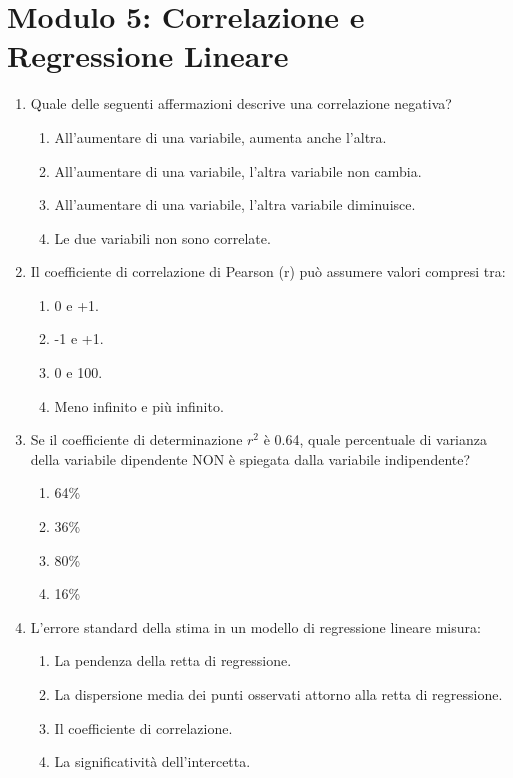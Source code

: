 \documentclass[12pt, a4paper]{article}
\begin{document}
\section*{Modulo 5: Correlazione e Regressione Lineare}
\begin{enumerate}[resume]
    \item Quale delle seguenti affermazioni descrive una correlazione negativa?
    \begin{enumerate}
        \item All'aumentare di una variabile, aumenta anche l'altra.
        \item All'aumentare di una variabile, l'altra variabile non cambia.
        \item All'aumentare di una variabile, l'altra variabile diminuisce.
        \item Le due variabili non sono correlate.
    \end{enumerate}
    \vspace{0.3cm}

    \item Il coefficiente di correlazione di Pearson (r) può assumere valori compresi tra:
    \begin{enumerate}
        \item 0 e +1.
        \item -1 e +1.
        \item 0 e 100.
        \item Meno infinito e più infinito.
    \end{enumerate}
    \vspace{0.3cm}

    \item Se il coefficiente di determinazione $r^2$ è 0.64, quale percentuale di varianza della variabile dipendente NON è spiegata dalla variabile indipendente?
    \begin{enumerate}
        \item 64\%
        \item 36\%
        \item 80\%
        \item 16\%
    \end{enumerate}
    \vspace{0.3cm}

    \item L'errore standard della stima in un modello di regressione lineare misura:
    \begin{enumerate}
        \item La pendenza della retta di regressione.
        \item La dispersione media dei punti osservati attorno alla retta di regressione.
        \item Il coefficiente di correlazione.
        \item La significatività dell'intercetta.
    \end{enumerate}
    \vspace{0.3cm}


\end{enumerate}
\end{document}
